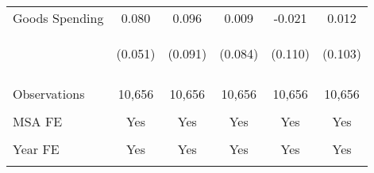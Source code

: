 \begin{tabular}{lccccc}
    Goods Spending & 0.080 & 0.096 & 0.009 & -0.021 & 0.012 \\
    & \begin{footnotesize}(0.051)\end{footnotesize} & \begin{footnotesize}(0.091)\end{footnotesize} & \begin{footnotesize}(0.084)\end{footnotesize} & \begin{footnotesize}(0.110)\end{footnotesize} & \begin{footnotesize}(0.103)\end{footnotesize} \\


    \vspace{4pt} & \begin{footnotesize}\end{footnotesize} & \begin{footnotesize}\end{footnotesize} & \begin{footnotesize}\end{footnotesize} & \begin{footnotesize}\end{footnotesize} & \begin{footnotesize}\end{footnotesize} \\
    Observations & 10,656 & 10,656 & 10,656 & 10,656 & 10,656 \\
    \vspace{-2pt} & \vspace{-2pt} & \vspace{-2pt} & \vspace{-2pt} & \vspace{-2pt} \\
    MSA FE & Yes & Yes & Yes & Yes & Yes \\
    \vspace{-2pt} & \vspace{-2pt} & \vspace{-2pt} & \vspace{-2pt} & \vspace{-2pt} \\
    Year FE & Yes & Yes & Yes & Yes & Yes \\
    \vspace{-2pt} & \vspace{-2pt} & \vspace{-2pt} & \vspace{-2pt} & \vspace{-2pt} \\

\end{tabular}

